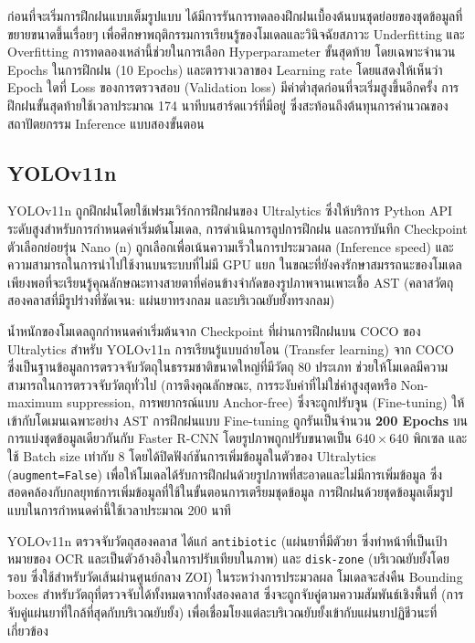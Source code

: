 ก่อนที่จะเริ่มการฝึกฝนแบบเต็มรูปแบบ ได้มีการรันการทดลองฝึกฝนเบื้องต้นบนชุดย่อยของชุดข้อมูลที่ขยายขนาดขึ้นเรื่อยๆ เพื่อศึกษาพฤติกรรมการเรียนรู้ของโมเดลและวินิจฉัยสภาวะ Underfitting และ Overfitting การทดลองเหล่านี้ช่วยในการเลือก Hyperparameter ขั้นสุดท้าย โดยเฉพาะจำนวน Epochs ในการฝึกฝน (10 Epochs) และตารางเวลาของ Learning rate โดยแสดงให้เห็นว่า Epoch ใดที่ Loss ของการตรวจสอบ (Validation loss) มีค่าต่ำสุดก่อนที่จะเริ่มสูงขึ้นอีกครั้ง การฝึกฝนขั้นสุดท้ายใช้เวลาประมาณ 174 นาทีบนฮาร์ดแวร์ที่มีอยู่ ซึ่งสะท้อนถึงต้นทุนการคำนวณของสถาปัตยกรรม Inference แบบสองขั้นตอน

\subsection{YOLOv11n}

YOLOv11n ถูกฝึกฝนโดยใช้เฟรมเวิร์กการฝึกฝนของ Ultralytics ซึ่งให้บริการ Python API ระดับสูงสำหรับการกำหนดค่าเริ่มต้นโมเดล, การดำเนินการลูปการฝึกฝน และการบันทึก Checkpoint \cite{wang2024yolov11} ตัวเลือกย่อยรุ่น Nano (n) ถูกเลือกเพื่อเน้นความเร็วในการประมวลผล (Inference speed) และความสามารถในการนำไปใช้งานบนระบบที่ไม่มี GPU แยก ในขณะที่ยังคงรักษาสมรรถนะของโมเดลเพียงพอที่จะเรียนรู้คุณลักษณะทางสายตาที่ค่อนข้างจำกัดของรูปภาพจานเพาะเชื้อ AST (คลาสวัตถุสองคลาสที่มีรูปร่างที่ชัดเจน: แผ่นยาทรงกลม และบริเวณยับยั้งทรงกลม)

น้ำหนักของโมเดลถูกกำหนดค่าเริ่มต้นจาก Checkpoint ที่ผ่านการฝึกฝนบน COCO ของ Ultralytics สำหรับ YOLOv11n การเรียนรู้แบบถ่ายโอน (Transfer learning) จาก COCO ซึ่งเป็นฐานข้อมูลการตรวจจับวัตถุในธรรมชาติขนาดใหญ่ที่มีวัตถุ 80 ประเภท ช่วยให้โมเดลมีความสามารถในการตรวจจับวัตถุทั่วไป (การดึงคุณลักษณะ, การระงับค่าที่ไม่ใช่ค่าสูงสุดหรือ Non-maximum suppression, การพยากรณ์แบบ Anchor-free) ซึ่งจะถูกปรับจูน (Fine-tuning) ให้เข้ากับโดเมนเฉพาะอย่าง AST การฝึกฝนแบบ Fine-tuning ถูกรันเป็นจำนวน \textbf{200 Epochs} บนการแบ่งชุดข้อมูลเดียวกันกับ Faster R-CNN โดยรูปภาพถูกปรับขนาดเป็น $640 \times 640$ พิกเซล และใช้ Batch size เท่ากับ 8 โดยได้ปิดฟังก์ชันการเพิ่มข้อมูลในตัวของ Ultralytics (\texttt{augment=False}) เพื่อให้โมเดลได้รับการฝึกฝนด้วยรูปภาพที่สะอาดและไม่มีการเพิ่มข้อมูล ซึ่งสอดคล้องกับกลยุทธ์การเพิ่มข้อมูลที่ใช้ในขั้นตอนการเตรียมชุดข้อมูล การฝึกฝนด้วยชุดข้อมูลเต็มรูปแบบในการกำหนดค่านี้ใช้เวลาประมาณ 200 นาที

YOLOv11n ตรวจจับวัตถุสองคลาส ได้แก่ \texttt{antibiotic} (แผ่นยาที่มีตัวยา ซึ่งทำหน้าที่เป็นเป้าหมายของ OCR และเป็นตัวอ้างอิงในการปรับเทียบในภาพ) และ \texttt{disk-zone} (บริเวณยับยั้งโดยรอบ ซึ่งใช้สำหรับวัดเส้นผ่านศูนย์กลาง ZOI) ในระหว่างการประมวลผล โมเดลจะส่งคืน Bounding boxes สำหรับวัตถุที่ตรวจจับได้ทั้งหมดจากทั้งสองคลาส ซึ่งจะถูกจับคู่ตามความสัมพันธ์เชิงพื้นที่ (การจับคู่แผ่นยาที่ใกล้ที่สุดกับบริเวณยับยั้ง) เพื่อเชื่อมโยงแต่ละบริเวณยับยั้งเข้ากับแผ่นยาปฏิชีวนะที่เกี่ยวข้อง

